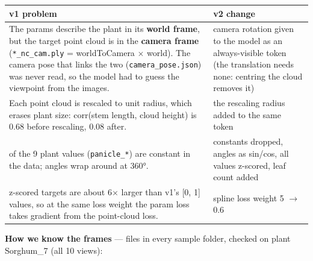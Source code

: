 \documentclass[
  10pt,
]{article}
\newcounter{none} %
\begin{document}
{\def\LTcaptype{none} %
\begin{longtable}[]{@{}
  >{\raggedright\arraybackslash}p{}
  >{\raggedright\arraybackslash}p{}@{}}
\toprule\noalign{}
\begin{minipage}[b]{\linewidth}\raggedright
v1 problem
\end{minipage} & \begin{minipage}[b]{\linewidth}\raggedright
v2 change
\end{minipage} \\
\midrule\noalign{}
\endhead
\bottomrule\noalign{}
\endlastfoot
The params describe the plant in its \textbf{world frame}, but the
target point cloud is in the \textbf{camera frame}
(\texttt{*\_nc\_cam.ply} = worldToCamera \(\times\) world). The camera
pose that links the two (\texttt{camera\_pose.json}) was never read, so
the model had to guess the viewpoint from the images. & camera rotation
given to the model as an always-visible token (the translation needs
none: centring the cloud removes it) \\
Each point cloud is rescaled to unit radius, which erases plant size:
corr(stem length, cloud height) is 0.68 before rescaling, 0.08 after. &
the rescaling radius added to the same token \\
5 of the 9 plant values (\texttt{panicle\_*}) are constant in the data;
angles wrap around at 360°. & constants dropped, angles as sin/cos, all
values z-scored, leaf count added \\
z-scored targets are about 6\(\times\) larger than v1's {[}0, 1{]}
values, so at the same loss weight the param loss takes gradient from
the point-cloud loss. & spline loss weight 5 \(\to\) 0.6 \\
\end{longtable}
}

\textbf{How we know the frames} --- files in every sample folder,
checked on plant Sorghum\_7 (all 10 views):
\end{document}
